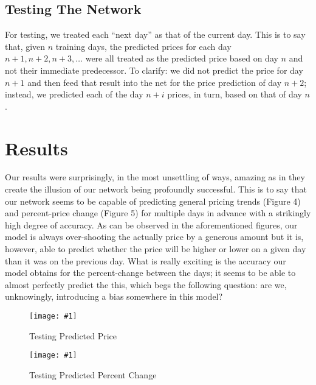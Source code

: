 \documentclass[conference]{IEEEtran}
\newcommand{\genFig}[2]
{
     \begin{figure}
        \centering
        \texttt{[image: \#1]}
        \caption{#2}
    \end{figure}
}
\begin{document}
\subsection{Testing The Network}
For testing, we treated each ``next day'' as that of the current day. This is to say that, given $n$
training days, the predicted prices for each day $n + 1, n + 2, n + 3, \ldots$ were all treated
as the predicted price based on day $n$ and not their immediate predecessor. To clarify: we did 
not predict the price for day $n + 1$ and then feed that result into the net for the price
prediction of day $n + 2$; instead, we predicted each of the day $n + i$ prices, in turn, based
on that of day
$n$.


\section{Results}
Our results were surprisingly, in the most unsettling of ways, amazing as in they create the
illusion of our network being profoundly successful. This is to say that our network seems to be
capable of predicting general pricing trends (Figure 4) and percent-price change (Figure 5) for
multiple days in advance with a strikingly high degree of accuracy. As can be observed in the
aforementioned figures, our model is always over-shooting the actually price by a generous amount
but it is, however, able to predict whether the price will be higher or lower on a given day than
it was on the previous day. What is really exciting is the accuracy our model obtains for the
percent-change between the days; it seems to be able to almost perfectly predict the this, which
begs the following question: are we, unknowingly, introducing a bias somewhere in this model?
\genFig{testing.png}{Testing Predicted Price}
\genFig{testing_percent.png}{Testing Predicted Percent Change}


\end{document}
